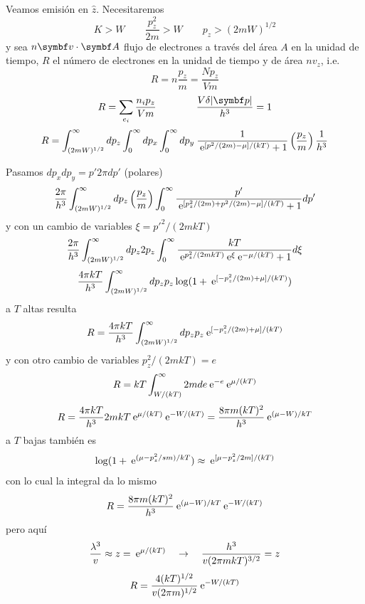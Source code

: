 \documentclass[10pt,oneside]{CBFT_book}
\begin{document}
Veamos emisión en $\hat{z}$. Necesitaremos 
\[
	K > W \qquad \frac{p_z^2}{2m} > W \qquad p_z > (2mW)^{1/2}
\]
y sea $ n \vb{v} \cdot \vb{A} $ flujo de electrones a través del área $A$ en la unidad de tiempo,
$R$ el número de electrones en la unidad de tiempo y de área $nv_z$, i.e.
\[
	R = n \frac{p_z}{m} = \frac{Np_z}{Vm}
\]
\[
	R = \sum_{e_i} \frac{ n_i p_z}{V m} \qquad \qquad  \frac{V\delta|\vb{p}|}{h^3} = 1
\]
\[
	R = \int^\infty_{(2mW)^{1/2}} dp_z \int_0^\infty dp_x \int_0^\infty dp_y \:
	\frac{1}{ \:\mathrm{e}^{[p^2/(2m) - \mu ]/ (kT)} + 1 } \left( \frac{ p_z }{ m } \right) \frac{1}{h^3}
\]

Pasamos $dp_x dp_y = p' 2\pi dp' $ (polares)
\[
	\frac{2\pi}{h^3} \int^\infty_{(2mW)^{1/2}} dp_z \left( \frac{ p_z }{ m } \right) \int_0^\infty 
	\frac{p'}{ \:\mathrm{e}^{[ p_z^2/(2m) + p^2/(2m) - \mu ]/ (kT)} + 1 } dp' 
\]
y con un cambio de variables $\xi = p'^2/(2mkT)$
\[
	\frac{2\pi}{h^3} \int^\infty_{(2mW)^{1/2}} dp_z 2 p_z \int_0^\infty 
	\frac{ kT }{ \:\mathrm{e}^{p_z^2/(2m kT)} \:\mathrm{e}^\xi \:\mathrm{e}^{-\mu/(kT)} + 1 } d\xi
\]
\[
	\frac{4\pi kT}{h^3} \int^\infty_{(2mW)^{1/2}} dp_z p_z \log( 1 + \:\mathrm{e}^{ [ -p_z^2/(2m) + \mu ]/ (kT) })
\]
a $T$ altas resulta 
\[
	R = \frac{4\pi kT}{h^3} \int^\infty_{(2mW)^{1/2}} dp_z p_z \:\mathrm{e}^{ [ -p_z^2/(2m) + \mu ]/ (kT) }
\]
y con otro cambio de variables $ p_z^2/(2mkT) = e $
\[
	R = kT \int^\infty_{ W/(kT) }  2m de \:\mathrm{e}^{-e} \:\mathrm{e}^{\mu/(kT)}
\]
\[
	R = \frac{ 4 \pi kT }{ h^3 } 2mkT \:\mathrm{e}^{\mu/(kT)} \:\mathrm{e}^{-W/(kT)} =
	\frac{8 \pi m (kT)^2 }{ h^3 } \:\mathrm{e}^{(\mu-W)/kT}
\]
a $T$ bajas también es 
\[
	\log( 1 + \:\mathrm{e}^{(\mu-p_z^2/sm)/kT}) \approx \:\mathrm{e}^{[ \mu-p_z^2/2m ]/ (kT)}
\]
con lo cual la integral da lo mismo
\[
	R = \frac{8 \pi m (kT)^2 }{ h^3 } \:\mathrm{e}^{(\mu-W)/kT} \:\mathrm{e}^{-W/(kT)}
\]
pero aquí 
\[
	\frac{\lambda^3}{v} \approx z = \:\mathrm{e}^{\mu/(kT)} \quad \rightarrow \quad 
	\frac{h^3}{v(2\pi m kT)^{3/2}} = z
\]
\[
	R = \frac{ 4(kT)^{1/2} }{v(2 \pi m)^{1/2}} \:\mathrm{e}^{-W/(kT)}
\]

\end{document}
